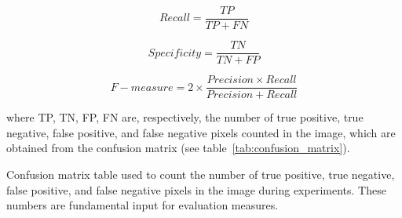 \begin{equation*}
    Recall = \frac{TP}{TP + FN}
    \label{eq:recall}
\end{equation*}

\begin{equation*}
    Specificity = \frac{TN}{TN + FP}
    \label{eq:specificity}
\end{equation*}

\begin{equation*}
    F-measure = 2 \times \frac{Precision \times Recall}{Precision + Recall}
    \label{eq:fmeasure}
\end{equation*}

where TP, TN, FP, FN are, respectively, the number of true positive, true negative, false positive, and false negative pixels counted in the image, which are obtained from the confusion matrix (see table~\ref{tab:confusion_matrix}).

\begin{table}[hb]
    \centering


    \caption[Confusion matrix table used during experiments]{Confusion matrix table used to count the number of true positive, true negative, false positive, and false negative pixels in the image during experiments. These numbers are fundamental input for evaluation measures.}
    \label{tab:confusion_matrix}
\end{table}




